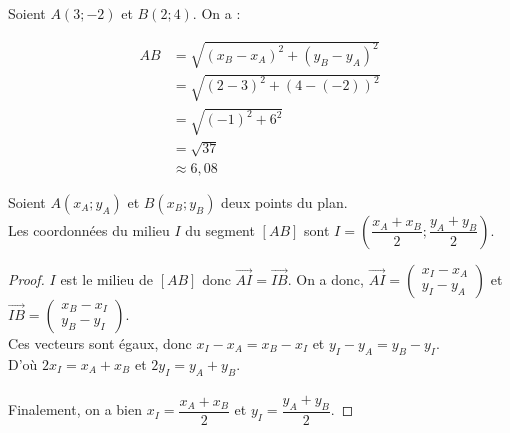 \begin{Exemple}
\begin{minipage}[c]{0.6\linewidth}
Soient $A(3;-2)$ et $B(2;4)$. On a :

\begin{align*}
AB &= \sqrt{(x_B-x_A)^2+(y_B-y_A)^2} \\
&= \sqrt{(2-3)^2+(4-(-2))^2} \\
&= \sqrt{(-1)^2+6^2} \\
&= \sqrt{37} \\
&\approx 6,08
\end{align*}
\end{minipage} \hfill
\begin{minipage}[c]{0.3\linewidth}
\end{minipage}


\end{Exemple}

\begin{Propriété}
Soient $A(x_A;y_A)$ et $B(x_B;y_B)$ deux points du plan. \\
Les coordonnées du milieu $I$ du segment $[AB]$ sont $I=\left(\dfrac{x_A+x_B}{2};\dfrac{y_A+y_B}{2}\right)$.

\end{Propriété}

\begin{proof}
$I$ est le milieu de $[AB]$ donc $\overrightarrow{AI}=\overrightarrow{IB}$. On a donc, $\overrightarrow{AI}=\begin{pmatrix} 
x_I-x_A \\
y_I-y_A
 \end{pmatrix}$ et $\overrightarrow{IB}=\begin{pmatrix} 
x_B-x_I \\
y_B-y_I
 \end{pmatrix}$. \\Ces vecteurs sont égaux, donc $x_I-x_A=x_B-x_I$ et $y_I-y_A=y_B-y_I$.\\
 D'où $2x_I=x_A+x_B$ et $2y_I=y_A+y_B$. \\
~\\
 Finalement, on a bien $x_I=\dfrac{x_A+x_B}{2}$ et $y_I=\dfrac{y_A+y_B}{2} $.
\end{proof}

